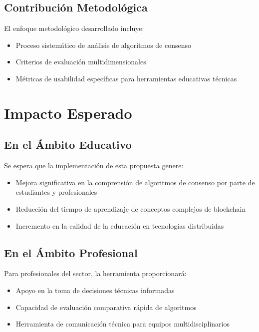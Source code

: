 \documentclass[spanish,12pt,letterpaper]{report}
\begin{document}
\subsection{Contribución Metodológica}

El enfoque metodológico desarrollado incluye:

\begin{itemize}
    \item Proceso sistemático de análisis de algoritmos de consenso
    \item Criterios de evaluación multidimensionales
    \item Métricas de usabilidad específicas para herramientas educativas técnicas
\end{itemize}

\section{Impacto Esperado}

\subsection{En el Ámbito Educativo}

Se espera que la implementación de esta propuesta genere:

\begin{itemize}
    \item Mejora significativa en la comprensión de algoritmos de consenso por parte de estudiantes y profesionales
    \item Reducción del tiempo de aprendizaje de conceptos complejos de blockchain
    \item Incremento en la calidad de la educación en tecnologías distribuidas
\end{itemize}

\subsection{En el Ámbito Profesional}

Para profesionales del sector, la herramienta proporcionará:

\begin{itemize}
    \item Apoyo en la toma de decisiones técnicas informadas
    \item Capacidad de evaluación comparativa rápida de algoritmos
    \item Herramienta de comunicación técnica para equipos multidisciplinarios
\end{itemize}
\end{document}
